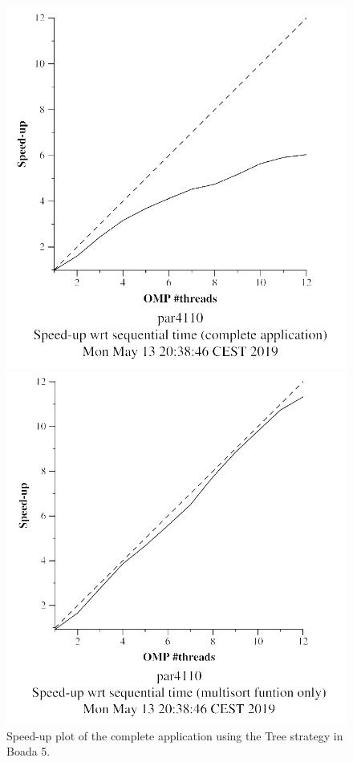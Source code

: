 \documentclass[12pt, a4paper]{article}
\begin{document}
\begin{figure}[H]
\centering
\begin{minipage}[b]{0.4\linewidth}
  \centering
  \includegraphics[scale=0.5]{./images/S2/multisort-omp-strong_boada-5_tree_complete_application}
  \caption{Speed-up plot of the complete application using the Tree strategy in Boada 5.}
  \label{fig:mandel-omp-10000-strong-21-time}
\end{minipage}%
\hspace{0.5cm}
\begin{minipage}[b]{0.4\linewidth}
  \centering
  \includegraphics[scale=0.5]{./images/S2/multisort-omp-strong_boada-5_tree_multisort_only}

\end{minipage}
\end{figure}
\end{document}
